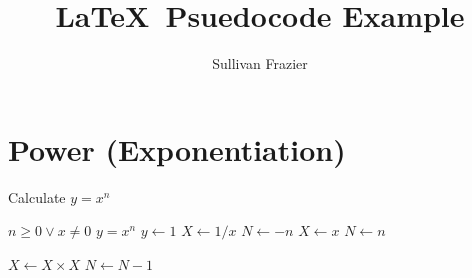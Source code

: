 \documentclass[12]{amsart}
\title{\LaTeX\ Psuedocode Example}%
\author{Sullivan Frazier}
\date{}
\begin{document}
\maketitle

\section{Power (Exponentiation)}

\begin{algorithm}
\caption{Calculate $y = x^n$}

\begin{algorithmic}
\REQUIRE $n \geq 0 \vee x  \neq 0$
\ENSURE $y = x^n$
\STATE $y \leftarrow 1$
\STATE $X \leftarrow 1/x $
\STATE $N \leftarrow -n$
\ELSE 
\STATE $X \leftarrow x$
\STATE $N \leftarrow n$
\ENDIF


\STATE $X \leftarrow X \times X$
\STATE $N \leftarrow N - 1$
\ENDIF
\ENDWHILE

\end{algorithmic}
\end{algorithm}
\end{document}
